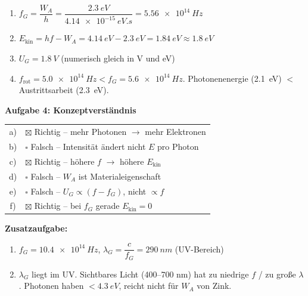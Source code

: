 \documentclass[11pt,a4paper]{article}
\begin{document}
\begin{enumerate}[label=\alph)]
\item {\color{loesung} $f_G = \dfrac{W_A}{h} = \dfrac{\SI{2,3}{eV}}{\SI{4,14e-15}{eV.s}} = \SI{5,56e14}{Hz}$}

\item {\color{loesung} $E_{\text{kin}} = hf - W_A = \SI{4,14}{eV} - \SI{2,3}{eV} = \SI{1,84}{eV} \approx \SI{1,8}{eV}$}

\item {\color{loesung} $U_G = \SI{1,8}{V}$ (numerisch gleich in V und eV)}

\item {\color{loesung} $f_{\text{rot}} = \SI{5,0e14}{Hz} < f_G = \SI{5,6e14}{Hz}$. Photonenenergie (\SI{2,1}{eV}) $<$ Austrittsarbeit (\SI{2,3}{eV}).}
\end{enumerate}

\vspace{0.5em}

\textbf{Aufgabe 4: Konzeptverständnis}

\begin{tabular}{cl}
a) & {\color{loesung} $\boxtimes$ Richtig -- mehr Photonen $\rightarrow$ mehr Elektronen} \\
b) & {\color{loesung} $\square$ Falsch -- Intensität ändert nicht $E$ pro Photon} \\
c) & {\color{loesung} $\boxtimes$ Richtig -- höhere $f$ $\rightarrow$ höhere $E_{\text{kin}}$} \\
d) & {\color{loesung} $\square$ Falsch -- $W_A$ ist Materialeigenschaft} \\
e) & {\color{loesung} $\square$ Falsch -- $U_G \propto (f - f_G)$, nicht $\propto f$} \\
f) & {\color{loesung} $\boxtimes$ Richtig -- bei $f_G$ gerade $E_{\text{kin}} = 0$} \\
\end{tabular}

\vspace{0.5em}

\textbf{Zusatzaufgabe:}

\begin{enumerate}[label=\alph)]
\item {\color{loesung} $f_G = \SI{10,4e14}{Hz}$, $\lambda_G = \dfrac{c}{f_G} = \SI{290}{nm}$ (UV-Bereich)}

\item {\color{loesung} $\lambda_G$ liegt im UV. Sichtbares Licht (400--700 nm) hat zu niedrige $f$ / zu große $\lambda$. Photonen haben $< \SI{4,3}{eV}$, reicht nicht für $W_A$ von Zink.}
\end{enumerate}
\end{document}
